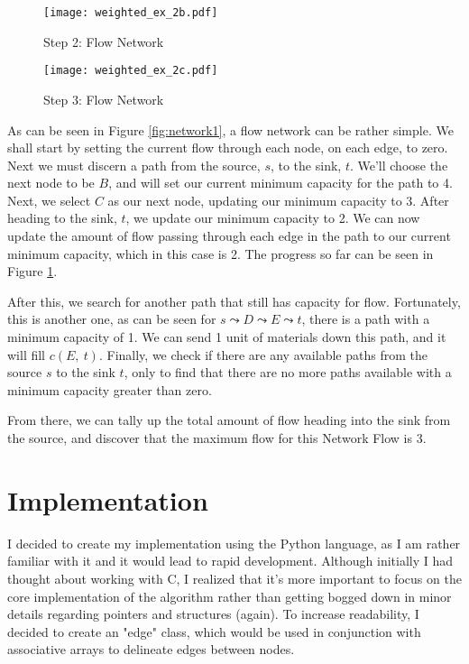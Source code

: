 \documentclass[conference]{IEEEtran}
\begin{document}
\begin{figure}[t]                     
\centering                             
\texttt{[image: weighted\_ex\_2b.pdf]}
\caption{Step 2: Flow Network}           
\label{fig:network2}
\end{figure}                           

\begin{figure}[t!]                     
\centering                             
\texttt{[image: weighted\_ex\_2c.pdf]}
\caption{Step 3: Flow Network}           
\label{fig:network3}
\end{figure}                           


As can be seen in Figure \ref{fig:network1}, a flow network can be rather simple. We shall start by setting the current flow through each node, on each edge, to zero. Next we must discern a path from the source, $s$, to the sink, $t$.  We'll choose the next node to be $B$, and will set our current minimum capacity for the path to 4. Next, we select $C$ as our next node, updating our minimum capacity to 3. After heading to the sink, $t$, we update our minimum capacity to 2. We can now update the amount of flow passing through each edge in the path to our current minimum capacity, which in this case is 2. The progress so far can be seen in Figure \ref{fig:network2}.

After this, we search for another path that still has capacity for flow. Fortunately, this is another one, as can be seen for $s \leadsto D \leadsto E \leadsto t$, there is a path with a minimum capacity of 1. We can send 1 unit of materials down this path, and it will fill $c(E,\ t)$. Finally, we check if there are any available paths from the source $s$ to the sink $t$, only to find that there are no more paths available with a minimum capacity greater than zero.

From there, we can tally up the total amount of flow heading into the sink from the source, and discover that the maximum flow for this Network Flow is 3.


\section{Implementation}

I decided to create my implementation using the Python language, as I am rather familiar with it and it would lead to rapid development. Although initially I had thought about working with C, I realized that it's more important to focus on the core implementation of the algorithm rather than getting bogged down in minor details regarding pointers and structures (again). To increase readability, I decided to create an "edge" class, which would be used in conjunction with associative arrays to delineate edges between nodes.
\end{document}
